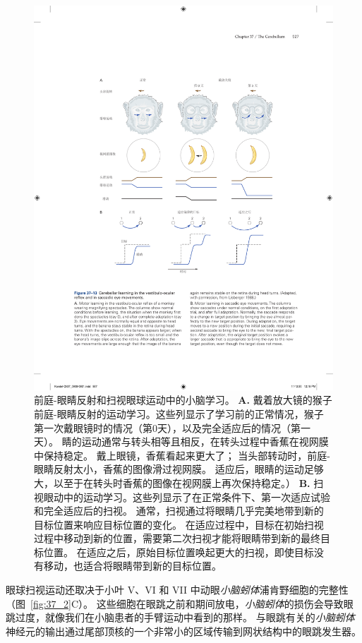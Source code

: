 \begin{figure}[htbp]
	\centering
	\includegraphics[width=0.95\linewidth]{chap37/fig_37_13}
	\caption{前庭-眼睛反射和扫视眼球运动中的小脑学习。
		\textbf{A.} 戴着放大镜的猴子前庭-眼睛反射的运动学习。这些列显示了学习前的正常情况，猴子第一次戴眼镜时的情况（第0天），以及完全适应后的情况（第一天）。
		睛的运动通常与转头相等且相反，在转头过程中香蕉在视网膜中保持稳定。
		戴上眼镜，香蕉看起来更大了；
		当头部转动时，前庭-眼睛反射太小，香蕉的图像滑过视网膜。
		适应后，眼睛的运动足够大，以至于在转头时香蕉的图像在视网膜上再次保持稳定\cite{lisberger1988neural}。）
		\textbf{B.} 扫视眼动中的运动学习。这些列显示了在正常条件下、第一次适应试验和完全适应后的扫视。
		通常，扫视通过将眼睛几乎完美地带到新的目标位置来响应目标位置的变化。
		在适应过程中，目标在初始扫视过程中移动到新的位置，需要第二次扫视才能将眼睛带到新的最终目标位置。
		在适应之后，原始目标位置唤起更大的扫视，即使目标没有移动，也适合将眼睛带到新的目标位置。}
	\label{fig:37_13}
\end{figure}


眼球扫视运动还取决于小叶 V、VI 和 VII 中动眼\textit{小脑蚓体}浦肯野细胞的完整性（图~\ref{fig:37_2}C）。
这些细胞在眼跳之前和期间放电，\textit{小脑蚓体}的损伤会导致眼跳过度，就像我们在小脑患者的手臂运动中看到的那样。
与眼跳有关的\textit{小脑蚓体}神经元的输出通过尾部顶核的一个非常小的区域传输到网状结构中的眼跳发生器。


